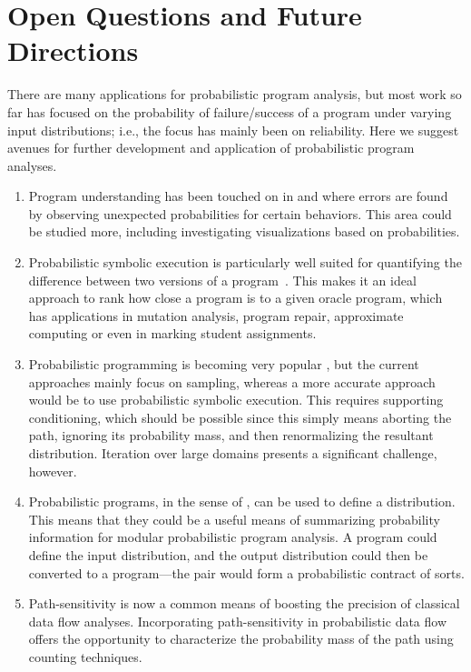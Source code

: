 \section{Open Questions and Future Directions}
\label{sec:future}

There are many applications for probabilistic program analysis, but most work so far has focused on the probability of failure/success of a program under varying input distributions; i.e., the focus has mainly been on reliability.
Here we suggest avenues for further development and application of
probabilistic program analyses.

\begin{enumerate}

\item Program understanding has been touched on in \cite{Geldenhuys2012} and \cite{Filieri2015} where errors are found by observing unexpected probabilities for certain behaviors. This area could be studied more, including investigating visualizations based on probabilities.

\item Probabilistic symbolic execution is particularly well suited for quantifying the difference between two versions of a program~\cite{Filieri2015b}. This makes it an ideal approach to rank how close a program is to a given oracle program, which has applications in mutation analysis, program repair, approximate computing or even in marking student assignments.

\item Probabilistic programming is becoming very popular \cite{Gordon2014}, but the current approaches mainly focus on sampling, whereas a more accurate approach would be to use probabilistic symbolic execution.  This requires supporting conditioning, which should be possible since this simply means aborting the path, ignoring its probability mass, and then renormalizing the resultant distribution.  Iteration over large domains presents a significant challenge, however.

\item Probabilistic programs, in the sense of \cite{Gordon2014}, can be used
to define a distribution.  This means that they could be a useful means of
summarizing probability information for modular probabilistic program analysis.
A program could define the input distribution, and the output distribution
could then be converted to a program---the pair would form a probabilistic
contract of sorts.

\item Path-sensitivity is now a common means of boosting the precision
of classical data flow analyses.  Incorporating path-sensitivity in
probabilistic data flow offers the opportunity to characterize
the probability mass of the path using counting techniques.


\end{enumerate}
